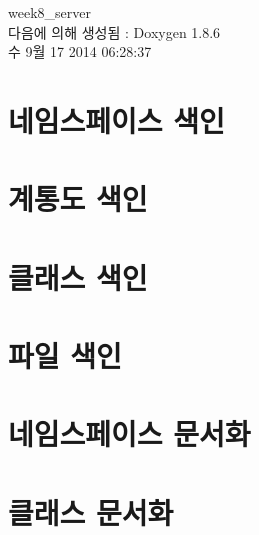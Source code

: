 \documentclass[twoside]{book}
\newcommand{\clearemptydoublepage}{%
  \newpage{\pagestyle{empty}\cleardoublepage}%
}
\begin{document}
\hypersetup{pageanchor=false}
\begin{titlepage}
\vspace*{7cm}
\begin{center}%
{\Large week8\-\_\-server }\\
\vspace*{1cm}
{\large 다음에 의해 생성됨 \-:  Doxygen 1.8.6}\\
\vspace*{0.5cm}
{\small 수 9월 17 2014 06:28:37}\\
\end{center}
\end{titlepage}
\clearemptydoublepage
\tableofcontents
\clearemptydoublepage
{}
\hypersetup{pageanchor=true}

\chapter{네임스페이스 색인}

\chapter{계통도 색인}

\chapter{클래스 색인}

\chapter{파일 색인}

\chapter{네임스페이스 문서화}

\chapter{클래스 문서화}













\end{document}
